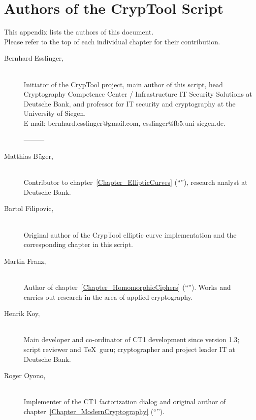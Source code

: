 \newpage
\hypertarget{appendix-authors}{}
\section{Authors of the CrypTool Script}
\label{s:appendix-authors}

This appendix lists the authors of this document.\\
Please refer to the top of each individual chapter for their contribution.

\begin{description}

\item[Bernhard Esslinger,] \mbox{}\\
Initiator of the CrypTool project, main author of this script, head Cryptography Competence Center / Infrastructure IT Security Solutions at Deutsche Bank, and professor for IT security and cryptography at the University of Siegen.\\
E-mail: bernhard.esslinger@gmail.com, esslinger@fb5.uni-siegen.de.

---------

\item[Matthias B\"uger,] \mbox{}\\ 
Contributor to chapter~\ref{Chapter_EllipticCurves} (``''),
research analyst at Deutsche Bank.

\item[Bartol Filipovic,] \mbox{}\\
Original author of the CrypTool elliptic curve
implementation and the corresponding chapter in this script.

\item[Martin Franz,] \mbox{}\\
Author of chapter~\ref{Chapter_HomomorphicCiphers}
(``'').
Works and carries out research in the area of applied cryptography.

\item[Henrik Koy,] \mbox{}\\
Main developer and co-ordinator of CT1 development
since version 1.3; script reviewer and \TeX\ guru; cryptographer 
and project leader IT at Deutsche Bank.

\item[Roger Oyono,] \mbox{}\\
Implementer of the CT1 factorization dialog and original author
of chapter~\ref{Chapter_ModernCryptography} (``'').


\end{description}
